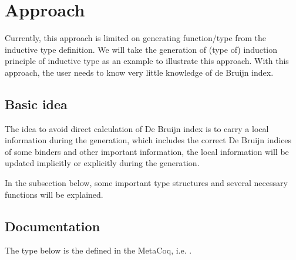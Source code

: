\documentclass[a4paper,UKenglish,cleveref, autoref, thm-restate]{lipics-v2021}
\begin{document}
\section{Approach}

Currently, this approach is limited on generating function/type from the inductive type definition. We will take the generation of (type of) induction principle of inductive type as an example to illustrate this approach. With this approach, the user needs to know very little knowledge of de Bruijn index.



\subsection{Basic idea}





The idea to avoid direct calculation of De Bruijn index is to carry a local information during the generation, which includes the correct De Bruijn indices of some binders and other important information, the local information will be updated implicitly or explicitly during the generation.

In the subsection below, some important type structures and several necessary functions will be explained.


\subsection{Documentation}

The type  below is the  defined in the MetaCoq, i.e. .
\end{document}
